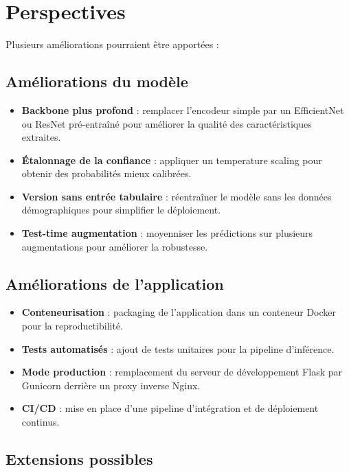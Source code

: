 \documentclass[12pt,a4paper,twoside]{report}
\begin{document}
\section{Perspectives}

Plusieurs améliorations pourraient être apportées :

\subsection{Améliorations du modèle}

\begin{itemize}
  \item \textbf{Backbone plus profond} : remplacer l'encodeur simple par un EfficientNet ou ResNet pré-entraîné pour améliorer la qualité des caractéristiques extraites.
  \item \textbf{Étalonnage de la confiance} : appliquer un temperature scaling pour obtenir des probabilités mieux calibrées.
  \item \textbf{Version sans entrée tabulaire} : réentraîner le modèle sans les données démographiques pour simplifier le déploiement.
  \item \textbf{Test-time augmentation} : moyenniser les prédictions sur plusieurs augmentations pour améliorer la robustesse.
\end{itemize}

\subsection{Améliorations de l'application}

\begin{itemize}
  \item \textbf{Conteneurisation} : packaging de l'application dans un conteneur Docker pour la reproductibilité.
  \item \textbf{Tests automatisés} : ajout de tests unitaires pour la pipeline d'inférence.
  \item \textbf{Mode production} : remplacement du serveur de développement Flask par Gunicorn derrière un proxy inverse Nginx.
  \item \textbf{CI/CD} : mise en place d'une pipeline d'intégration et de déploiement continus.
\end{itemize}

\subsection{Extensions possibles}
\end{document}
